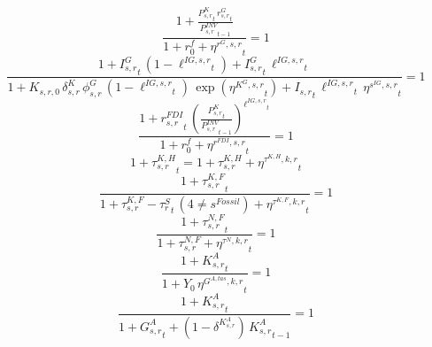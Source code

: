 \noindent[name= `sector specific public rental rate 3 1']
\begin{dmath}
\frac{1+\frac{{{P^K_{s,r}}}_{t}\, {{r^G_{s,r}}}_{t}}{{{P^{INV}_{s,r}}}_{t-1}}}{1+{{r^f_0}}+{{\eta^{r^G,s,r}}}_{t}}=1
\end{dmath}
\noindent[name= `scenario sector specific public capital / investment share 3 1']
\begin{dmath}
\frac{1+{{I^G_{s,r}}}_{t}\, \left(1-{{\ell^{IG,s,r}}}_{t}\right)+{{I^G_{s,r}}}_{t}\, {{\ell^{IG,s,r}}}_{t}}{1+{{K_{s,r,0}}}\, {{\delta^{K}_{s,r}}}\, {{\phi^{G}_{s,r}}}\, \left(1-{{\ell^{IG,s,r}}}_{t}\right)\, \exp\left({{\eta^{K^G,s,r}}}_{t}\right)+{{I_{s,r}}}_{t}\, {{\ell^{IG,s,r}}}_{t}\, {{\eta^{s^{IG},s,r}}}_{t}}=1
\end{dmath}
\noindent[name= `FDI rental rate (returns to foreign investors) 3 1']
\begin{dmath}
\frac{1+{{r^{FDI}_{s,r}}}_{t}\, \left(\frac{{{P^K_{s,r}}}_{t}}{{{P^{INV}_{s,r}}}_{t-1}}\right)^{{{\ell^{IG,s,r}}}_{t}}}{1+{{r^f_0}}+{{\eta^{r^{FDI},s,r}}}_{t}}=1
\end{dmath}
\noindent[name= `taxes on household capital income 4 1']
\begin{dmath}
1+{{\tau^{K,H}_{s,r}}}_{t}=1+{{\tau^{K,H}_{s,r}}}+{{\eta^{\tau^{K,H},k,r}}}_{t}
\end{dmath}
\noindent[name= `sector specific corporate tax rate paid by firms 4 1']
\begin{dmath}
\frac{1+{{\tau^{K,F}_{s,r}}}_{t}}{1+{{\tau^{K,F}_{s,r}}}-{{\tau^{S}_{r}}}_{t}\, \left(4\neq {{s^{Fossil}}}\right)+{{\eta^{\tau^{K,F},k,r}}}_{t}}=1
\end{dmath}
\noindent[name= `sector specific labour tax rate paid by firms 4 1']
\begin{dmath}
\frac{1+{{\tau^{N,F}_{s,r}}}_{t}}{1+{{\tau^{N,F}_{s,r}}}+{{\eta^{\tau^{N},k,r}}}_{t}}=1
\end{dmath}
\noindent[name= `sector specific adaptation capital target from government expenditure 4 1']
\begin{dmath}
\frac{1+{{K^{A}_{s,r}}}_{t}}{1+{{Y_0}}\, {{\eta^{G^{A,tas},k,r}}}_{t}}=1
\end{dmath}
\noindent[name= `sector specific adaptation capital against climate change 4 1']
\begin{dmath}
\frac{1+{{K^{A}_{s,r}}}_{t}}{1+{{G^{A}_{s,r}}}_{t}+\left(1-{{\delta^{K^{A}_{s,r}}}}\right)\, {{K^{A}_{s,r}}}_{t-1}}=1
\end{dmath}
